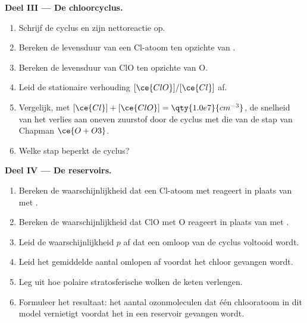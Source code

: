 \begin{problem}
\medskip\noindent\textbf{Deel III --- De chloorcyclus.}
\begin{enumerate}[resume]
  \item Schrijf de cyclus en zijn nettoreactie op.
  \item Bereken de levensduur van een Cl-atoom ten opzichte van .
  \item Bereken de levensduur van ClO ten opzichte van O.
  \item Leid de stationaire verhouding $[\ce{ClO}]/[\ce{Cl}]$ af.
  \item Vergelijk, met $[\ce{Cl}] + [\ce{ClO}] = \qty{1.0e7}{cm^{-3}}$, de
        snelheid van het verlies aan oneven zuurstof door de cyclus met die
        van de stap van Chapman $\ce{O + O3}$.
  \item Welke stap beperkt de cyclus?
\end{enumerate}

\medskip\noindent\textbf{Deel IV --- De reservoirs.}
\begin{enumerate}[resume]
  \item Bereken de waarschijnlijkheid dat een Cl-atoom met  reageert
        in plaats van met
        .
  \item Bereken de waarschijnlijkheid dat ClO met O reageert in plaats van
        met .
  \item Leid de waarschijnlijkheid $p$ af dat een omloop van de cyclus
        voltooid wordt.
  \item Leid het gemiddelde aantal omlopen af voordat het chloor gevangen
        wordt.
  \item Leg uit hoe polaire stratosferische wolken de keten verlengen.
  \item Formuleer het resultaat: het aantal ozonmoleculen dat één
        chlooratoom in dit model vernietigt voordat het in een reservoir
        gevangen wordt.
\end{enumerate}
\end{problem}
